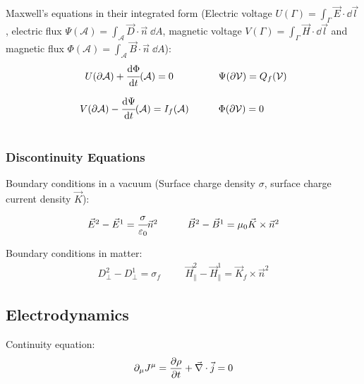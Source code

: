 		\noindent
		Maxwell's equations in their integrated form (Electric voltage $U(\Gamma)=\int_\Gamma \vec{E}\cdot\dd\vec{l}$, electric flux $\Psi(\mathcal{A})=\int_\mathcal{A}\vec{D}\cdot\vec{n}\;\dd A$, magnetic voltage $V(\Gamma)=\int_\Gamma \vec{H}\cdot\dd\vec{l}$ and magnetic flux $\Phi(\mathcal{A})=\int_\mathcal{A}\vec{B}\cdot\vec{n}\;\dd A$):
		\begin{equation}
		\begin{array}{rl}
			U(\partial \mathcal{A}) + \cfrac{\dd\Phi}{\dd t}(\mathcal{A}) = 0\phantom{(\mathcal{A})}
			&\hspace{20pt} \Psi(\partial\mathcal{V}) = Q_f(\mathcal{V}) \\ \xrowht{40pt}
			V(\partial \mathcal{A}) - \cfrac{\dd \Psi}{\dd t}(\mathcal{A}) = I_f(\mathcal{A})
			&\hspace{20pt} \Phi(\partial\mathcal{V}) = 0 \\
		\end{array}
		\end{equation}

		\subsubsection{Discontinuity Equations}
			\noindent
			Boundary conditions in a vacuum (Surface charge density $\sigma$, surface charge current density $\vec{K}$):
		\begin{equation}
		\begin{array}{cc}
			\vec{E}^2 - \vec{E}^1 = \cfrac{\sigma}{\varepsilon_0}\Vec{n}^2
			&\hspace{20pt} \vec{B}^2 - \vec{B}^1 = \mu_0\vec{K}\times\Vec{n}^2
		\end{array}
		\end{equation}

			\noindent
			Boundary conditions in matter:
		\begin{equation}
		\begin{array}{cc}
			D_\perp^2 - D_\perp^1 = \sigma_f
			&\hspace{20pt} \vec{H}_\parallel^2 - \vec{H}_\parallel^1 = \vec{K}_f\times\Vec{n}^2
		\end{array}
		\end{equation}

	\subsection{Electrodynamics}
		\noindent
		Continuity equation:
		\begin{equation}
			\partial_\mu J^\mu = \pdv{\rho}{t} + \vec{\nabla}\cdot\vec{j} = 0
		\end{equation}

